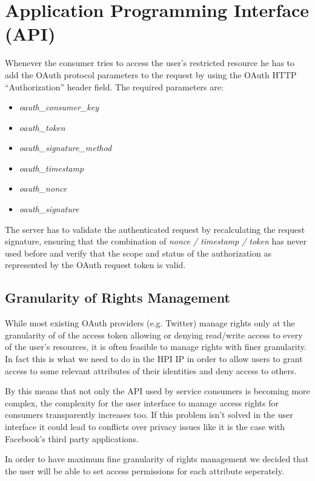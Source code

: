 \section{Application Programming Interface (API)}

Whenever the consumer tries to access the user's restricted
resource he has to add the OAuth protocol parameters to the request
by using the OAuth HTTP ``Authorization'' header field. The
required parameters are:

\begin{itemize}
\item
  \emph{oauth\_consumer\_key}
\item
  \emph{oauth\_token}
\item
  \emph{oauth\_signature\_method}
\item
  \emph{oauth\_timestamp}
\item
  \emph{oauth\_nonce}
\item
  \emph{oauth\_signature}
\end{itemize}
The server has to validate the authenticated request by
recalculating the request signature, ensuring that the combination
of \emph{nonce / timestamp / token} has never used before and
verify that the scope and status of the authorization as
represented by the OAuth request token is valid.

\subsection{Granularity of Rights Management}

While most existing OAuth providers (e.g. Twitter) manage rights
only at the granularity of of the access token allowing or denying
read/write access to every of the user's resources, it is often
feasible to manage rights with finer granularity. In fact this is
what we need to do in the HPI IP in order to allow users to grant
access to some relevant attributes of their identities and deny
access to others.

By this means that not only the API used by service consumers is becoming more
complex, the complexity for the user interface to manage access
rights for consumers transparently increases too. If this problem
isn't solved in the user interface it could lead to conflicts over
privacy issues like it is the case with Facebook's third party
applications.

In order to have maximum fine granularity of rights management we
decided that the user will be able to set access permissions
for each attribute seperately.


